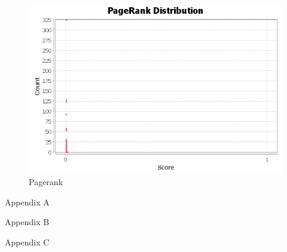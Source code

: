 \documentclass{article}
\begin{document}
\graphicspath{{q3/pagerank/}}
\begin{figure}
  \centering
  \caption{Pagerank}
  \includegraphics[scale=.5]{pageranks.png}
\end{figure}
\vfill
\clearpage

\newpage
\appendix
Appendix A


\newpage
Appendix B


\newpage
Appendix C

\end{document}
